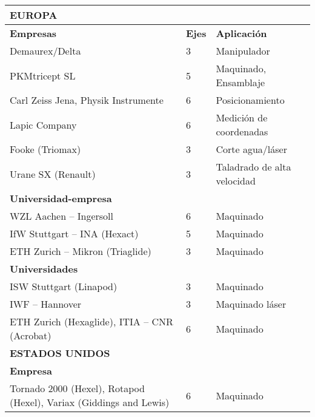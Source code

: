 \begin{longtable}[c]{m{} m{} m{}}
    \hline \rowcolor[gray]{0.9} \textbf{EUROPA} & & \\ \hline
    \textbf{Empresas} & \textbf{Ejes} & \textbf{Aplicación} \\
    Demaurex/Delta          & 3 & Manipulador \\
    PKMtricept SL           & 5 & Maquinado, Ensamblaje \\
    Carl Zeiss Jena, Physik Instrumente         & 6 & Posicionamiento \\
    Lapic Company           & 6 & Medición de coordenadas \\
    Fooke (Triomax)         & 3 & Corte agua/láser \\
    Urane SX (Renault)      & 3 & Taladrado de alta velocidad \\
    \textbf{Universidad-empresa} & & \\
    WZL Aachen – Ingersoll  & 6 & Maquinado \\
    IfW Stuttgart – INA (Hexact) & 5 & Maquinado \\
    ETH Zurich – Mikron (Triaglide) & 3 & Maquinado \\
    \textbf{Universidades} & & \\
    ISW Stuttgart (Linapod) & 3 & Maquinado \\
    IWF – Hannover          & 3 & Maquinado láser\\
    ETH Zurich (Hexaglide), ITIA – CNR (Acrobat)  & 6 & Maquinado \\
    \hline \rowcolor[gray]{0.9} \textbf{ESTADOS UNIDOS} & & \\ \hline
    \textbf{Empresa} & & \\
    Tornado 2000 (Hexel), Rotapod (Hexel), Variax (Giddings and Lewis)    & 6 & Maquinado \\

\end{longtable}
